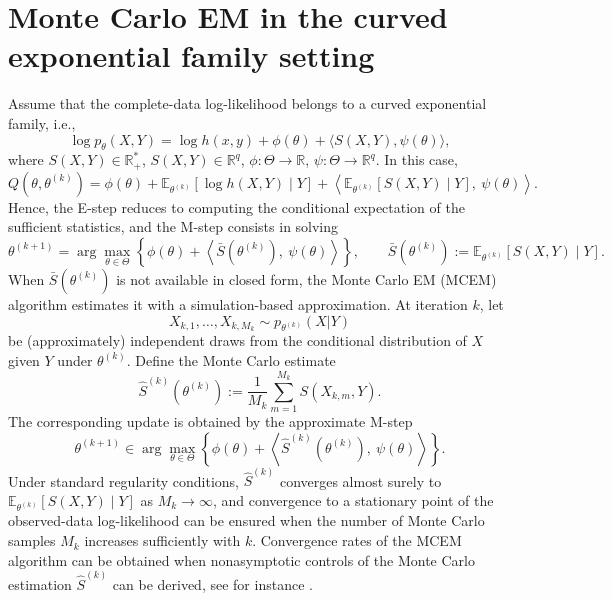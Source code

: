 \documentclass[english,graybox,envcountchap,envcountsame,sectrefs,shortlabels]{svmono}
\theoremstyle{style}
\begin{document}
\section{Monte Carlo EM  in the curved exponential family setting}
Assume that the complete-data log-likelihood belongs to a curved exponential family,
i.e.,
\[
\log p_\theta(X,Y)= \log h(x,y) +  \phi(\theta) + \langle S(X,Y), \psi(\theta)\rangle,
\]
where $S(X,Y)\in\mathbb{R}_+^*$,  $S(X,Y)\in\mathbb{R}^q$, $\phi:\Theta\to\mathbb{R}$,
$\psi:\Theta\to\mathbb{R}^q$. In this case,
\[
Q(\theta,\theta^{(k)})
= \phi(\theta) + \mathbb{E}_{\theta^{(k)}}[\log h(X,Y)\mid Y]+ \left\langle 
\mathbb{E}_{\theta^{(k)}}[S(X,Y)\mid Y],\ \psi(\theta)
\right\rangle.
\]
Hence, the E-step reduces to computing the conditional expectation of the sufficient
statistics, and the M-step consists in solving
\[
\theta^{(k+1)} = \arg\max_{\theta\in\Theta}\left\{
\phi(\theta) + \left\langle \bar S(\theta^{(k)}),\ \psi(\theta)\right\rangle
\right\},
\qquad
\bar S(\theta^{(k)}) := \mathbb{E}_{\theta^{(k)}}[S(X,Y)\mid Y].
\]
When $\bar S(\theta^{(k)})$ is not available in closed form, the Monte Carlo EM (MCEM)
algorithm estimates it with a simulation-based approximation. At iteration $k$, let
\[
X_{k,1},\ldots,X_{k,M_k} \sim p_{\theta^{(k)}}(X | Y)
\]
be (approximately) independent draws from the conditional distribution of $X$ given
$Y$ under $\theta^{(k)}$. Define the Monte Carlo estimate
\[
\widehat S^{(k)}(\theta^{(k)}) := \frac{1}{M_k}\sum_{m=1}^{M_k} S\!\left(X_{k,m},Y\right).
\]
The corresponding %
update is obtained by the approximate M-step
\[
\theta^{(k+1)} \in \arg\max_{\theta\in\Theta}\left\{
\phi(\theta) + \left\langle \widehat S^{(k)}(\theta^{(k)}),\ \psi(\theta)\right\rangle
\right\}.
\]
Under standard regularity conditions, $\widehat S^{(k)}$ converges
almost surely to $\mathbb{E}_{\theta^{(k)}}[S(X,Y)\mid Y]$ as $M_k\to\infty$, and convergence to a
stationary point of the observed-data log-likelihood can be ensured when the number of Monte
Carlo samples $M_k$ increases sufficiently with $k$. Convergence rates of the MCEM algorithm can be obtained when nonasymptotic controls of the Monte Carlo estimation $\widehat S^{(k)}$ can be derived, see for instance \cite{fort2003convergence}.

\end{document}
